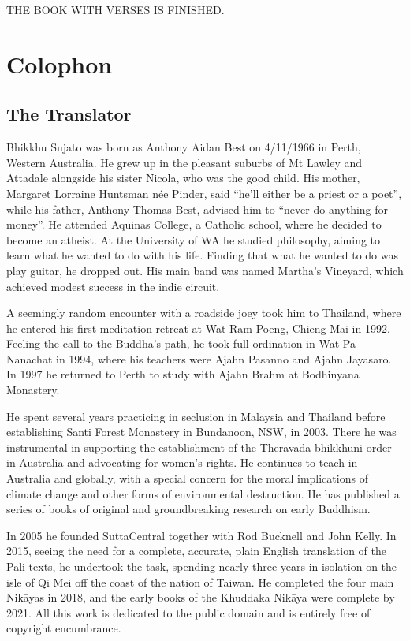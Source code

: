 \documentclass[12pt,openany]{book}%
\newcommand*{\scendbook}[1]{\begin{center}\uppercase{#1}\end{center}}
\let\oldbackmatter\backmatter
\renewcommand{\backmatter}{%
\chapterfont{\setstretch{.85}\normalfont\centering}%
\sectionfont{\setstretch{.85}\Semiboldsubheadfont}%
\oldbackmatter}
\begin{document}
\scendbook{The Book With Verses is finished. }

%
\backmatter%
\chapter*{Colophon}

\section*{The Translator}

Bhikkhu Sujato was born as Anthony Aidan Best on 4/11/1966 in Perth, Western Australia. He grew up in the pleasant suburbs of Mt Lawley and Attadale alongside his sister Nicola, who was the good child. His mother, Margaret Lorraine Huntsman née Pinder, said “he’ll either be a priest or a poet”, while his father, Anthony Thomas Best, advised him to “never do anything for money”. He attended Aquinas College, a Catholic school, where he decided to become an atheist. At the University of WA he studied philosophy, aiming to learn what he wanted to do with his life. Finding that what he wanted to do was play guitar, he dropped out. His main band was named Martha’s Vineyard, which achieved modest success in the indie circuit. 

A seemingly random encounter with a roadside joey took him to Thailand, where he entered his first meditation retreat at Wat Ram Poeng, Chieng Mai in 1992. Feeling the call to the Buddha’s path, he took full ordination in Wat Pa Nanachat in 1994, where his teachers were Ajahn Pasanno and Ajahn Jayasaro. In 1997 he returned to Perth to study with Ajahn Brahm at Bodhinyana Monastery. 

He spent several years practicing in seclusion in Malaysia and Thailand before establishing Santi Forest Monastery in Bundanoon, NSW, in 2003. There he was instrumental in supporting the establishment of the Theravada bhikkhuni order in Australia and advocating for women’s rights. He continues to teach in Australia and globally, with a special concern for the moral implications of climate change and other forms of environmental destruction. He has published a series of books of original and groundbreaking research on early Buddhism. 

In 2005 he founded SuttaCentral together with Rod Bucknell and John Kelly. In 2015, seeing the need for a complete, accurate, plain English translation of the Pali texts, he undertook the task, spending nearly three years in isolation on the isle of Qi Mei off the coast of the nation of Taiwan. He completed the four main \textsanskrit{Nikāyas} in 2018, and the early books of the Khuddaka \textsanskrit{Nikāya} were complete by 2021. All this work is dedicated to the public domain and is entirely free of copyright encumbrance. 
\end{document}
